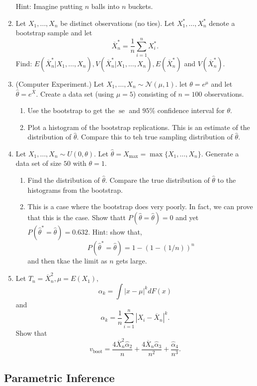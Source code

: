 \documentclass{article}
\newcommand{\se}{\operatorname{se}}
\begin{document}
\begin{enumerate}
	Hint: Imagine putting $n$ balls into $n$ buckets.
	\item Let $X_1, \dots, X_n$ be distinct observations (no ties). Let $X_1^*, \dots, X_n^*$ denote a bootstrap sample and let
	$$
	\overline{X}_n^* = \frac{1}{n} \sum_{i = 1}^n X_i^*.
	$$
	Find: $E(\overline{X}_n^* | X_1, \dots, X_n), V(\overline{X}_n^*|X_1, \dots, X_n), E(\overline{X}_n^*)$ and $V(\overline{X}_n^*)$.
	\item (Computer Experiment.) Let $X_1, \dots, X_n \sim \mathcal{N}(\mu, 1)$. let $\theta = e^\mu$ and let $\hat{\theta} = e^{\overline{X}}$. Create a data set (using $\mu = 5$) consisting of $n = 100$ observations.
		\begin{enumerate}
			\item Use the bootstrap to get the $\se$ and $95\%$ confidence interval for $\theta$.
			\item Plot a histogram of the bootstrap replications. This is an estimate of the distribution of $\hat{\theta}$. Compare this to teh true sampling distribution of $\hat{\theta}$.
		\end{enumerate}
	\item Let $X_1, \dots, X_n \sim U(0, \theta)$. Let $\hat{\theta} = X_{\max} = \max\{X_1, \dots, X_n\}$. Generate a data set of size $50$ with $\theta = 1$.
		\begin{enumerate}
			\item Find the distribution of $\hat{\theta}$. Compare the true distribution of $\hat{\theta}$ to the histograms from the bootstrap.
			\item This is a case where the bootstrap does very poorly. In fact, we can prove that this is the case. Show thatt $P(\hat{\theta} = \hat{\theta}) = 0$ and yet $P(\hat{\theta}^* = \hat{\theta}) = 0.632.$ Hint: show that,
			$$
			P(\hat{\theta}^* = \hat{\theta}) = 1 - (1 - (1 / n))^n
			$$
			and then tkae the limit as $n$ gets large.
		\end{enumerate}
	\item Let $T_n = \overline{X}_n^2, \mu = E(X_1),$
	$$
	\alpha_k = \int |x - \mu|^k dF(x)
	$$
	and
	$$
	\hat{\alpha}_k = \frac{1}{n} \sum_{i = 1}^n |X_i - \overline{X}_n|^k.
	$$
	Show that
	$$
	v_{\operatorname{boot}} = \frac{4 \overline{X}_n^2 \hat{\alpha}_2}{n} + \frac{4 \overline{X}_n \hat{\alpha}_3}{n^2} + \frac{\hat{\alpha}_4}{n^3}.
	$$
\end{enumerate}

\subsection{Parametric Inference}
\end{document}
